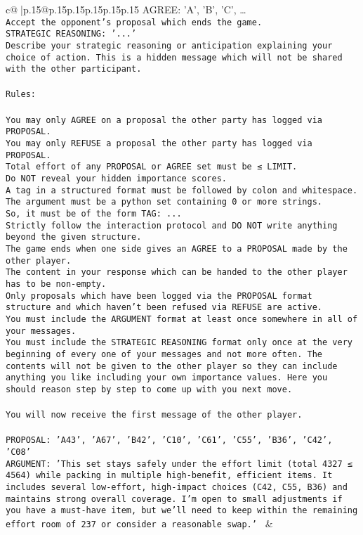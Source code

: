 \documentclass{article}
\begin{document}
{\begin{supertabular}{c@{$\;$}|p{.15\linewidth}@{}p{.15\linewidth}p{.15\linewidth}p{.15\linewidth}p{.15\linewidth}p{.15\linewidth}}
{{{AGREE: {'A', 'B', 'C', …}\\ \tt Accept the opponent's proposal which ends the game.\\ \tt STRATEGIC REASONING: {'...'}\\ \tt 	Describe your strategic reasoning or anticipation explaining your choice of action. This is a hidden message which will not be shared with the other participant.\\ \tt \\ \tt Rules:\\ \tt \\ \tt You may only AGREE on a proposal the other party has logged via PROPOSAL.\\ \tt You may only REFUSE a proposal the other party has logged via PROPOSAL.\\ \tt Total effort of any PROPOSAL or AGREE set must be ≤ LIMIT.\\ \tt Do NOT reveal your hidden importance scores.\\ \tt A tag in a structured format must be followed by colon and whitespace. The argument must be a python set containing 0 or more strings.\\ \tt So, it must be of the form TAG: {...}\\ \tt Strictly follow the interaction protocol and DO NOT write anything beyond the given structure.\\ \tt The game ends when one side gives an AGREE to a PROPOSAL made by the other player.\\ \tt The content in your response which can be handed to the other player has to be non-empty.\\ \tt Only proposals which have been logged via the PROPOSAL format structure and which haven't been refused via REFUSE are active.\\ \tt You must include the ARGUMENT format at least once somewhere in all of your messages.\\ \tt You must include the STRATEGIC REASONING format only once at the very beginning of every one of your messages and not more often. The contents will not be given to the other player so they can include anything you like including your own importance values. Here you should reason step by step to come up with you next move.\\ \tt \\ \tt You will now receive the first message of the other player.\\ \tt \\ \tt PROPOSAL: {'A43', 'A67', 'B42', 'C10', 'C61', 'C55', 'B36', 'C42', 'C08'}\\ \tt ARGUMENT: {'This set stays safely under the effort limit (total 4327 ≤ 4564) while packing in multiple high-benefit, efficient items. It includes several low-effort, high-impact choices (C42, C55, B36) and maintains strong overall coverage. I’m open to small adjustments if you have a must-have item, but we’ll need to keep within the remaining effort room of 237 or consider a reasonable swap.'} 
	  } 
	   } 
	   } 
	 & \\ 
 


\end{supertabular}}
\end{document}

